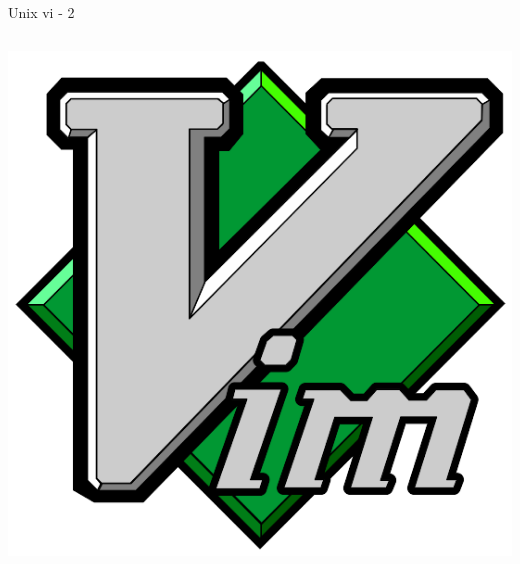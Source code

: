 \documentclass[unknownkeysallowed, 10pt, a4 paper, handout]{beamer}
\begin{document}
\begin{frame}[label=vim2]{Unix vi - 2}
\begin{columns}[T]
\begin{column}{.25\textwidth}
      \includegraphics[scale=0.08]{pics/vim.png}
    \end{column}
  \end{columns}
\end{frame}
\end{document}
